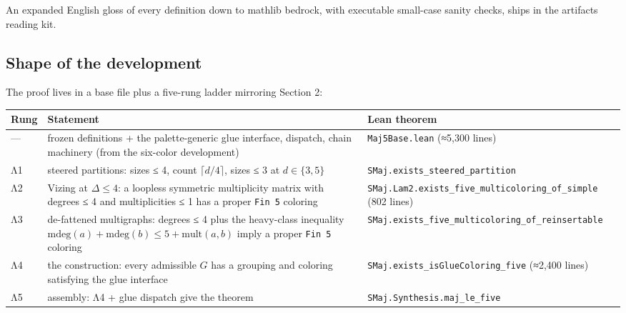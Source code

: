 \documentclass[11pt]{article}
\theoremstyle{definition}
\theoremstyle{remark}
\begin{document}
An expanded English gloss of every definition down to mathlib bedrock, with executable small-case sanity checks, ships in the artifact\textquotesingle s reading kit.

\subsection{Shape of the development}\label{32-shape-of-the-development}

The proof lives in a base file plus a five-rung ladder mirroring Section 2:

\begin{center}
\small
\renewcommand{\arraystretch}{1.12}
\begin{tabular}{@{}p{}p{}p{}@{}}
\toprule
Rung & Statement & Lean theorem \\
\midrule
--- & frozen definitions + the palette-generic glue interface, dispatch, chain machinery (from the six-color development) & \texttt{Maj5Base.lean} (≈5,300 lines) \\
Λ1 & steered partitions: sizes ≤ 4, count \(\lceil d/4\rceil\), sizes ≤ 3 at \(d \in \{3,5\}\) & \texttt{SMaj.exists\_\allowbreak steered\_\allowbreak partition} \\
Λ2 & Vizing at \(\Delta \le 4\): a loopless symmetric multiplicity matrix with degrees ≤ 4 and multiplicities ≤ 1 has a proper \texttt{Fin 5} coloring & \texttt{SMaj.Lam2.exists\_\allowbreak five\_\allowbreak multicoloring\_\allowbreak of\_\allowbreak simple} (802 lines) \\
Λ3 & de-fattened multigraphs: degrees ≤ 4 plus the heavy-class inequality \(\mathrm{mdeg}(a)+\mathrm{mdeg}(b) \le 5 + \mathrm{mult}(a,b)\) imply a proper \texttt{Fin 5} coloring & \texttt{SMaj.exists\_\allowbreak five\_\allowbreak multicoloring\_\allowbreak of\_\allowbreak reinsertable} \\
Λ4 & the construction: every admissible \(G\) has a grouping and coloring satisfying the glue interface & \texttt{SMaj.exists\_\allowbreak isGlueColoring\_\allowbreak five} (≈2,400 lines) \\
Λ5 & assembly: Λ4 + glue dispatch give the theorem & \texttt{SMaj.Synthesis.maj\_\allowbreak le\_\allowbreak five} \\
\bottomrule
\end{tabular}
\end{center}
\end{document}
